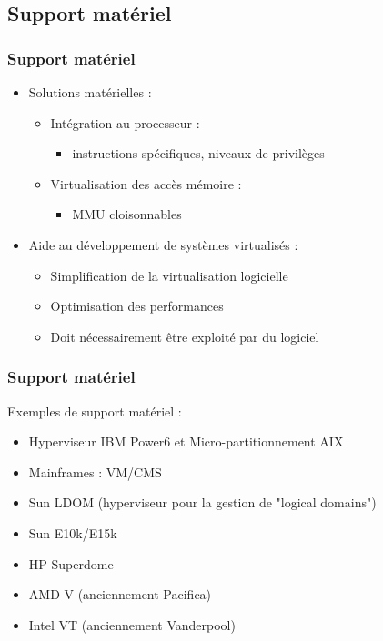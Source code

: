 \subsection{Support matériel}


\begin{frame}
\frametitle{Support matériel}
\begin{itemize}
\item <1> Solutions matérielles :
\begin{itemize}
\item Intégration au processeur : 
\begin{itemize}
\item instructions spécifiques, niveaux de privilèges

\end{itemize}
\item Virtualisation des accès mémoire :
\begin{itemize}
\item MMU cloisonnables

\end{itemize}
\end{itemize}

\item <2> Aide au développement de systèmes virtualisés :
\begin{itemize}
\item Simplification de la virtualisation logicielle
\item Optimisation des performances
\item Doit nécessairement être exploité par du logiciel
\end{itemize}


\end{itemize}


\end{frame}

\begin{frame}
\frametitle{Support matériel}
Exemples de support matériel :
\begin{itemize}
\item Hyperviseur IBM Power6 et Micro-partitionnement AIX
\item Mainframes : VM/CMS
\item Sun LDOM (hyperviseur pour la gestion de "logical domains")
\item Sun E10k/E15k
\item HP Superdome
\item AMD-V (anciennement Pacifica)
\item Intel VT (anciennement Vanderpool)
\end{itemize}
\end{frame}

